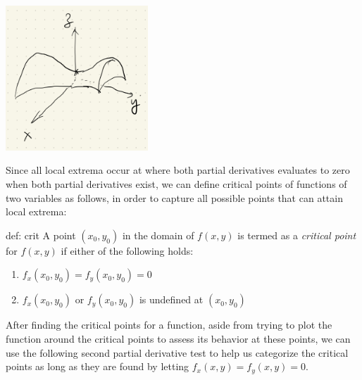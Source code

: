 \begin{center}
    \includegraphics[width = 0.4\textwidth]{figures/chap 08/saddle.png}
\end{center}

Since all local extrema occur at where both partial derivatives evaluates to zero when both partial derivatives exist, we can define critical points of functions of two variables as follows, in order to capture all possible points that can attain local extrema:

\begin{defi}{def: crit}
    A point $(x_0, y_0)$ in the domain of $f(x, y)$ is termed as a \textit{critical point} for $f(x, y)$ if either of the following holds:
    \begin{enumerate}
        \item $f_x(x_0, y_0) = f_y(x_0, y_0) = 0$
        \item $f_x(x_0, y_0)$ or $f_y(x_0, y_0)$ is undefined at $(x_0, y_0)$
    \end{enumerate}
\end{defi}

After finding the critical points for a function, aside from trying to plot the function around the critical points to assess its behavior at these points, we can use the following second partial derivative test to help us categorize the critical points as long as they are found by letting $f_x(x,y) = f_y(x,y) = 0$.


